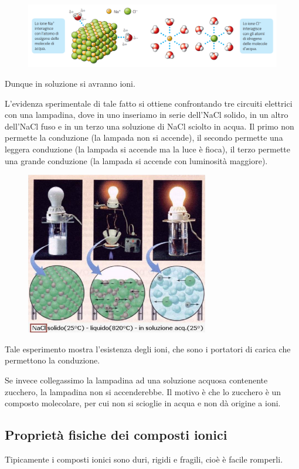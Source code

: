 \vspace{-0.3cm}\begin{figure}[htp]
    \centering
    \includegraphics[width=15cm]{immagini/interazione-acqua-ioni.png}
\end{figure}

\vspace{-0.3cm}Dunque in soluzione si avranno ioni.

L'evidenza sperimentale di tale fatto si ottiene confrontando tre circuiti elettrici con una lampadina, dove in uno inseriamo in serie dell'NaCl solido, in un altro dell'NaCl fuso e in un terzo una soluzione di NaCl sciolto in acqua. Il primo non permette la conduzione (la lampada non si accende), il secondo permette una leggera conduzione (la lampada si accende ma la luce è fioca), il terzo permette una grande conduzione (la lampada si accende con luminosità maggiore).

\begin{figure}[htp]
    \centering
    \includegraphics[width=8cm]{immagini/lampadina.png}
\end{figure}

Tale esperimento mostra l'esistenza degli ioni, che sono i portatori di carica che permettono la conduzione.

Se invece collegassimo la lampadina ad una soluzione acquosa contenente zucchero, la lampadina non si accenderebbe. Il motivo è che lo zucchero è un composto molecolare, per cui non si scioglie in acqua e non dà origine a ioni.
\subsection{Proprietà fisiche dei composti ionici}
Tipicamente i composti ionici sono duri, rigidi e fragili, cioè è facile romperli.

